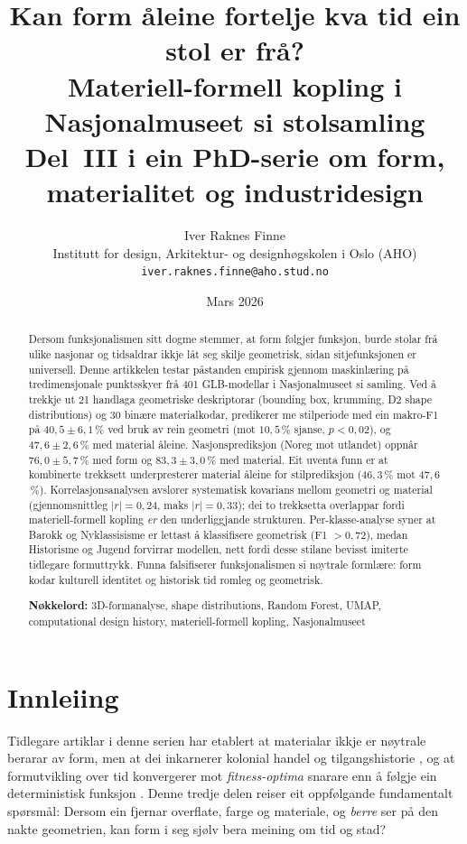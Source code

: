 \documentclass[12pt,a4paper]{article}
\title{Kan form \aa{}leine fortelje kva tid ein stol er fr\aa{}?\\
\large Materiell-formell kopling i Nasjonalmuseet si stolsamling\\[0.5em]
\normalsize Del~III i ein PhD-serie om form, materialitet og industridesign}
\author{Iver Raknes Finne\\
\small Institutt for design, Arkitektur- og designh\o{}gskolen i Oslo (AHO)\\
\small\texttt{iver.raknes.finne@aho.stud.no}}
\date{Mars 2026}
\begin{document}
\maketitle

\begin{abstract}
\noindent
Dersom funksjonalismen sitt dogme stemmer, at form f\o{}lgjer funksjon, burde stolar fr\aa{} ulike nasjonar og tidsaldrar ikkje l\aa{}t seg skilje geometrisk, sidan sitjefunksjonen er universell. Denne artikkelen testar p\aa{}standen empirisk gjennom maskinl\ae{}ring p\aa{} tredimensjonale punktsskyer fr\aa{} 401 GLB-modellar i Nasjonalmuseet si samling. Ved \aa{} trekkje ut 21 handlaga geometriske deskriptorar (bounding box, krumming, D2 shape distributions) og 30 bin\ae{}re materialkodar, predikerer me stilperiode med ein makro-F1 p\aa{} $40{,}5 \pm 6{,}1$\,\% ved bruk av rein geometri (mot $10{,}5$\,\% sjanse, $p < 0{,}02$), og $47{,}6 \pm 2{,}6$\,\% med material \aa{}leine. Nasjonsprediksjon (Noreg mot utlandet) oppn\aa{}r $76{,}0 \pm 5{,}7$\,\% med form og $83{,}3 \pm 3{,}0$\,\% med material. Eit uventa funn er at kombinerte trekksett underpresterer material \aa{}leine for stilprediksjon ($46{,}3$\,\% mot $47{,}6$\,\%). Korrelasjonsanalysen avsl\o{}rer systematisk kovarians mellom geometri og material (gjennomsnittleg $|r| = 0{,}24$, maks $|r| = 0{,}33$); dei to trekksetta overlappar fordi materiell-formell kopling \emph{er} den underliggjande strukturen. Per-klasse-analyse syner at Barokk og Nyklassisisme er lettast \aa{} klassifisere geometrisk (F1 $> 0{,}72$), medan Historisme og Jugend forvirrar modellen, nett fordi desse stilane bevisst imiterte tidlegare formuttrykk. Funna falsifiserer funksjonalismen si n\o{}ytrale forml\ae{}re: form kodar kulturell identitet og historisk tid romleg og geometrisk.

\medskip
\noindent\textbf{N\o{}kkelord:} 3D-formanalyse, shape distributions, Random Forest, UMAP, computational design history, materiell-formell kopling, Nasjonalmuseet
\end{abstract}

\section{Innleiing}

Tidlegare artiklar i denne serien har etablert at materialar ikkje er n\o{}ytrale berarar av form, men at dei inkarnerer kolonial handel og tilgangshistorie \citep{finne2026a}, og at formutvikling over tid konvergerer mot \emph{fitness-optima} snarare enn \aa{} f\o{}lgje ein deterministisk funksjon \citep{finne2026b}. Denne tredje delen reiser eit oppf\o{}lgande fundamentalt sp\o{}rsm\aa{}l: Dersom ein fjernar overflate, farge og materiale, og \emph{berre} ser p\aa{} den nakte geometrien, kan form i seg sj\o{}lv bera meining om tid og stad?
\end{document}
